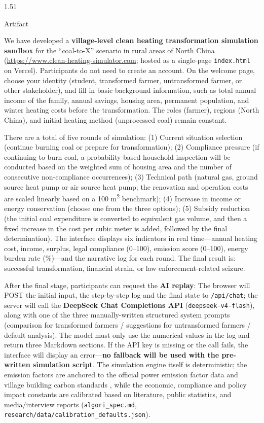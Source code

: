\documentclass[stu,12pt,floatsintext,donotrepeattitle]{apa7}
\makeatletter
\newcommand{\Sihao}{\fontsize{14pt}{18pt}\selectfont}
\renewcommand{\subsection}{\@startsection{subsection}{2}{\z@}%
  {1.5\baselineskip}{1\baselineskip}%
  {\normalfont\Sihao\bfseries\raggedright}}
\makeatother
\begin{document}
\subsection{Artifact}

We have developed a \textbf{village-level clean heating transformation simulation sandbox} for the ``coal-to-X'' scenario in rural areas of North China (\url{https://www.clean-heating-simulator.com}; hosted as a single-page \texttt{index.html} on Vercel). Participants do not need to create an account. On the welcome page, choose your identity (student, transformed farmer, untransformed farmer, or other stakeholder), and fill in basic background information, such as total annual income of the family, annual savings, housing area, permanent population, and winter heating costs before the transformation. The roles (farmer), regions (North China), and initial heating method (unprocessed coal) remain constant.

There are a total of five rounds of simulation: (1) Current situation selection (continue burning coal or prepare for transformation); (2) Compliance pressure (if continuing to burn coal, a probability-based household inspection will be conducted based on the weighted sum of housing area and the number of consecutive non-compliance occurrences); (3) Technical path (natural gas, ground source heat pump or air source heat pump; the renovation and operation costs are scaled linearly based on a 100 m\textsuperscript{2} benchmark); (4) Increase in income or energy conservation (choose one from the three options); (5) Subsidy reduction (the initial coal expenditure is converted to equivalent gas volume, and then a fixed increase in the cost per cubic meter is added, followed by the final determination). The interface displays six indicators in real time---annual heating cost, income, surplus, legal compliance (0--100), emission score (0--100), energy burden rate (\%)---and the narrative log for each round. The final result is: successful transformation, financial strain, or law enforcement-related seizure.

After the final stage, participants can request the \textbf{AI replay}: The browser will POST the initial input, the step-by-step log and the final state to \texttt{/api/chat}; the server will call the \textbf{DeepSeek Chat Completions API} (\texttt{deepseek-v4-flash}), along with one of the three manually-written structured system prompts (comparison for transformed farmers / suggestions for untransformed farmers / default analysis). The model must only use the numerical values in the log and return three Markdown sections. If the API key is missing or the call fails, the interface will display an error---\textbf{no fallback will be used with the pre-written simulation script}. The simulation engine itself is deterministic; the emission factors are anchored to the official power emission factor data and village building carbon standards \cite{mee2011ghg,mee2020grid,cabr2025rural}, while the economic, compliance and policy impact constants are calibrated based on literature, public statistics, and media/interview reports (\texttt{algori\_spec.md}, \texttt{research/data/calibration\_defaults.json}).
\end{document}
